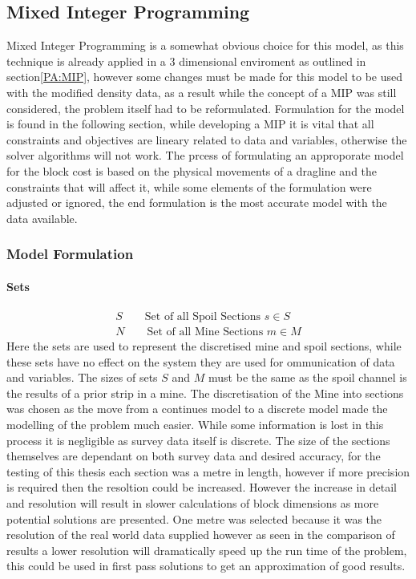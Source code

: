 \subsection{Mixed Integer Programming}
Mixed Integer Programming is a somewhat obvious choice for this model, as this technique is already applied in a 3 dimensional enviroment as outlined in section\ref{PA:MIP}, however some changes must be made for this model to be used with the modified density data, as a result while the concept of a MIP was still considered, the problem itself had to be reformulated. Formulation for the model is found in the following section, while developing a MIP it is vital that all constraints and objectives are lineary related to data and variables, otherwise the solver algorithms will not work. The prcess of formulating an approporate model for the block cost is based on the physical movements of a dragline and the constraints that will affect it, while some elements of the formulation were adjusted or ignored, the end formulation is the most accurate model with the data available. 
\subsubsection{Model Formulation} 
\paragraph*{Sets}
\begin{align}
\label{MIP:Set:S}
S\qquad \text{Set of all Spoil Sections   } s\in S\\
\label{MIP:Set:N}
N\qquad \text{Set of all Mine Sections } m \in M
\end{align}
Here the sets are used to represent the discretised mine and spoil sections, while these sets have no effect on the system they are used for ommunication of data and variables. The sizes of sets $S$ and $M$ must be the same as the spoil channel is the results of a prior strip in a mine. The discretisation of the Mine into sections was chosen as the move from a continues model to a discrete model made the modelling of the problem much easier. While some information is lost in this process it is negligible as survey data itself is discrete. The size of the sections themselves are dependant on both survey data and desired accuracy, for the testing of this thesis each section was a metre in length, however if more precision is required then the resoltion could be increased. However the increase in detail and resolution will result in slower calculations of block dimensions as more potential solutions are presented. One metre was selected because it was the resolution of the real world data supplied however as seen in the comparison of results a lower resolution will dramatically speed up the run time of the problem, this could be used in first pass solutions to get an approximation of good results. 
